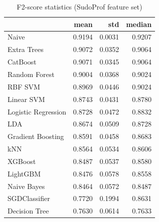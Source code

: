 \begin{table}
\caption{F2-score statistics (SudoProf feature set)}
\label{tab:f2_SudoProf_stats}
\begin{tabular}{lrrr}
\toprule
 & mean & std & median \\
\midrule
Naive & 0.9194 & 0.0031 & 0.9207 \\
Extra Trees & 0.9072 & 0.0352 & 0.9064 \\
CatBoost & 0.9071 & 0.0345 & 0.9064 \\
Random Forest & 0.9004 & 0.0368 & 0.9024 \\
RBF SVM & 0.8969 & 0.0446 & 0.9024 \\
Linear SVM & 0.8743 & 0.0431 & 0.8780 \\
Logistic Regression & 0.8728 & 0.0472 & 0.8832 \\
LDA & 0.8674 & 0.0509 & 0.8728 \\
Gradient Boosting & 0.8591 & 0.0458 & 0.8683 \\
kNN & 0.8564 & 0.0534 & 0.8606 \\
XGBoost & 0.8487 & 0.0537 & 0.8580 \\
LightGBM & 0.8476 & 0.0578 & 0.8558 \\
Naive Bayes & 0.8464 & 0.0572 & 0.8487 \\
SGDClassifier & 0.7720 & 0.1994 & 0.8631 \\
Decision Tree & 0.7630 & 0.0614 & 0.7633 \\
\bottomrule
\end{tabular}
\end{table}
